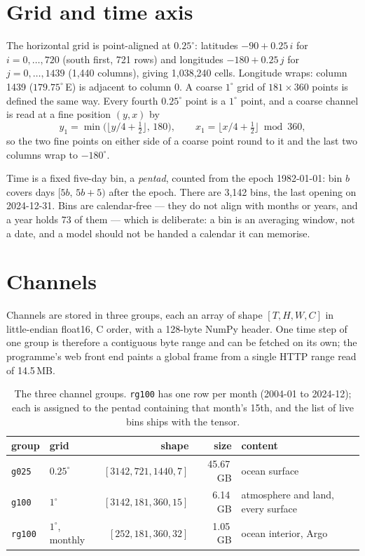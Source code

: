 \documentclass[10pt]{article}
\newcommand{\code}[1]{\texttt{#1}}
\begin{document}
\section{Grid and time axis}

The horizontal grid is point-aligned at $0.25^\circ$: latitudes
$-90 + 0.25\,i$ for $i = 0,\dots,720$ (south first, 721 rows) and longitudes
$-180 + 0.25\,j$ for $j = 0,\dots,1439$ (1,440 columns), giving 1,038,240
cells. Longitude wraps: column 1439 ($179.75^\circ$\,E) is adjacent to column
0. A coarse $1^\circ$ grid of $181\times360$ points is defined the same way.
Every fourth $0.25^\circ$ point is a $1^\circ$ point, and a coarse channel is
read at a fine position $(y,x)$ by
\begin{equation}
y_1 = \min\!\big(\lfloor y/4 + \tfrac12\rfloor,\,180\big),\qquad
x_1 = \lfloor x/4 + \tfrac12\rfloor \bmod 360 ,
\end{equation}
so the two fine points on either side of a coarse point round to it and the
last two columns wrap to $-180^\circ$.

Time is a fixed five-day bin, a \emph{pentad}, counted from the epoch
1982-01-01: bin $b$ covers days $[5b,\,5b+5)$ after the epoch. There are
3,142 bins, the last opening on 2024-12-31. Bins are calendar-free --- they
do not align with months or years, and a year holds 73 of them --- which is
deliberate: a bin is an averaging window, not a date, and a model should not
be handed a calendar it can memorise.

\section{Channels}

Channels are stored in three groups, each an array of shape
$[T, H, W, C]$ in little-endian float16, C order, with a 128-byte NumPy
header. One time step of one group is therefore a contiguous byte range and
can be fetched on its own; the programme's web front end paints a global
frame from a single HTTP range read of 14.5\,MB.

\begin{table}[h]
\centering\small
\begin{tabular}{@{}llrrl@{}}
\toprule
group & grid & shape & size & content \\
\midrule
\code{g025} & $0.25^\circ$ & $[3142, 721, 1440, 7]$ & 45.67\,GB & ocean surface \\
\code{g100} & $1^\circ$ & $[3142, 181, 360, 15]$ & 6.14\,GB & atmosphere and land, every surface \\
\code{rg100} & $1^\circ$, monthly & $[252, 181, 360, 32]$ & 1.05\,GB & ocean interior, Argo \\
\bottomrule
\end{tabular}
\caption{The three channel groups. \code{rg100} has one row per month
(2004-01 to 2024-12); each is assigned to the pentad containing that month's
15th, and the list of live bins ships with the tensor.}
\end{table}
\end{document}
